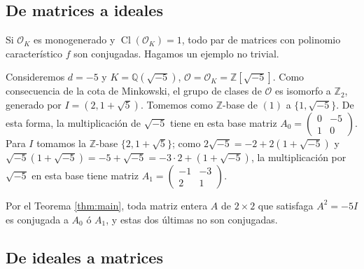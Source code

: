 \documentclass[11pt,a4paper]{amsart}
\newcommand{\Q}{\mathbb{Q}}
\newcommand{\Z}{\mathbb{Z}}
\DeclareMathOperator{\CL}{Cl}
\numberwithin{equation}{section}
\theoremstyle{plain}
\renewcommand{\O}{\mathcal{O}}
\begin{document}
\subsection{De matrices a ideales} Si $\O_K$ es monogenerado
y $\CL(\O_K) = 1$, todo par de matrices con polinomio característico
$f$ son conjugadas. Hagamos un ejemplo no trivial.

Consideremos $d = -5$ y $K = \Q(\sqrt{-5})$, $\O = \O_K = \Z[\sqrt{-5}]$.
Como consecuencia de la cota de Minkowski,
el grupo de clases de $\O$ es isomorfo a $\Z_2$, generado por
$I = (2,1+\sqrt{5})$. Tomemos como $\Z$-base de $(1)$ a
$\{1,\sqrt{-5}\}$. De esta forma, la multiplicación de $\sqrt{-5}$
tiene en esta base matriz $A_0 =
\begin{pmatrix}0 & -5\\ 1 & 0\end{pmatrix}$.
Para $I$ tomamos la $\Z$-base $\{2,1+\sqrt{5}\}$;
como $2\sqrt{-5} = -2 + 2(1+\sqrt{-5})$ y $\sqrt{-5}(1+\sqrt{-5}) = -5 +
\sqrt{-5} = -3 \cdot 2 + (1+\sqrt{-5})$, la multiplicación
por $\sqrt{-5}$ en esta base tiene matriz $A_1 = \begin{pmatrix}
-1 & -3\\ 2 & 1 \end{pmatrix}$.

Por el Teorema \ref{thm:main}, toda matriz entera $A$
de $2 \times 2$ que satisfaga $A^2 = -5 I$ es conjugada a $A_0$ ó $A_1$,
y estas dos últimas no son conjugadas.

\subsection{De ideales a matrices}
\end{document}
